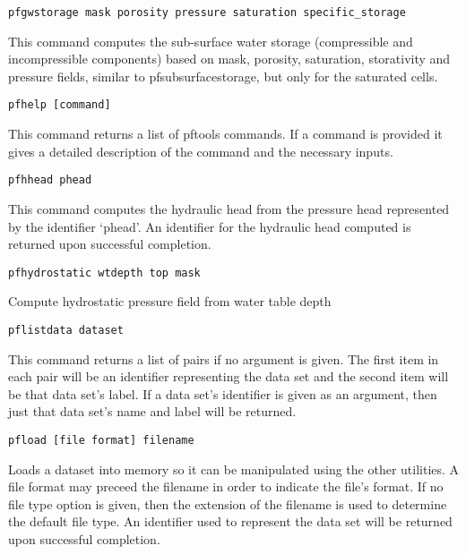 \begin{description}
\item{\begin{verbatim}pfgwstorage mask porosity pressure saturation specific_storage\end{verbatim}}
This command computes the sub-surface water storage (compressible and incompressible components)
based on mask, porosity, saturation, storativity and pressure fields, similar to pfsubsurfacestorage,
but only for the saturated cells.

\item{\begin{verbatim}pfhelp [command]\end{verbatim}}
This command returns a list of pftools commands. If a command is provided it gives a detailed
description of the command and the necessary inputs.

\item{\begin{verbatim}pfhhead phead\end{verbatim}}
This command computes the hydraulic head from the pressure head
represented by the identifier `phead'.  An identifier for the
hydraulic head computed is returned upon successful completion.

\item{\begin{verbatim}pfhydrostatic wtdepth top mask\end{verbatim}}
Compute hydrostatic pressure field from water table depth

\item{\begin{verbatim}pflistdata dataset\end{verbatim}}
This command returns a list of pairs if no argument is given.  The
first item in each pair will be an identifier representing the data
set and the second item will be that data set's label.  If a data
set's identifier is given as an argument, then just that data set's
name and label will be returned.


\item{\begin{verbatim}pfload [file format] filename\end{verbatim}}
Loads a dataset into memory so it can be manipulated using the other
utilities.  A file format may preceed the filename in order to
indicate the file's format.  If no file type option is given, then the
extension of the filename is used to determine the default file type.
An identifier used to represent the data set will be returned upon
successful completion.


\end{description}
